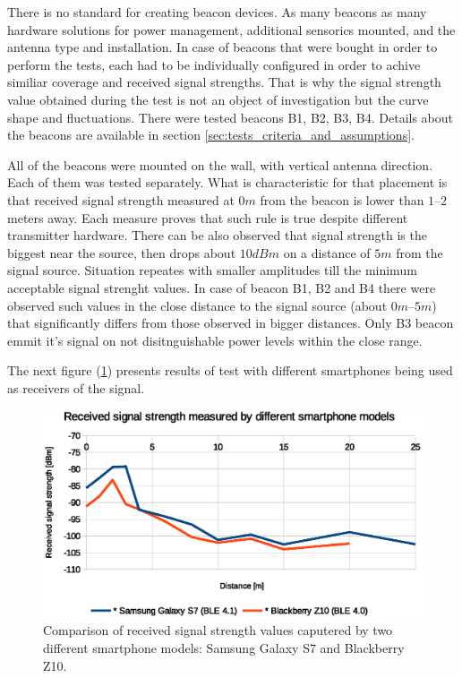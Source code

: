 \documentclass[../main.tex]{subfiles}
\begin{document}
There is no standard for creating beacon devices. As many beacons as many hardware solutions for power management, additional sensorics mounted, and the antenna type and installation. In case of beacons that were bought in order to perform the tests, each had to be individually configured in order to achive similiar coverage and received signal strengths. That is why the signal strength value obtained during the test is not an object of investigation but the curve shape and fluctuations. There were tested beacons B1, B2, B3, B4. Details about the beacons are available in section \ref{sec:tests_criteria_and_assumptions}.

All of the beacons were mounted on the wall, with vertical antenna direction. Each of them was tested separately. What is characteristic for that placement is that received signal strength measured at $0 m$ from the beacon is lower than $1$--$2$ meters away. Each measure proves that such rule is true despite different transmitter hardware. There can be also observed that signal strength is the biggest near the source, then drops about $10dBm$ on a distance of $5m$ from the signal source. Situation repeates with smaller amplitudes till the minimum acceptable signal strenght values. In case of beacon B1, B2 and B4 there were observed such values in the close distance to the signal source (about $0m$--$5m$) that significantly differs from those observed in bigger distances. Only B3 beacon emmit it's signal on not disitnguishable power levels within the close range.

The next figure (\ref{fig:tests_case9_smartphone_comparison}) presents results of test with different smartphones being used as receivers of the signal.

\begin{figure}[!htbp]
\includegraphics[width=\textwidth, keepaspectratio]{pictures/tests_case9_smartphone_comparison}
\centering
\caption{Comparison of received signal strength values caputered by two different smartphone models: Samsung Galaxy S7 and Blackberry Z10.}
\label{fig:tests_case9_smartphone_comparison}
\end{figure}
\end{document}

